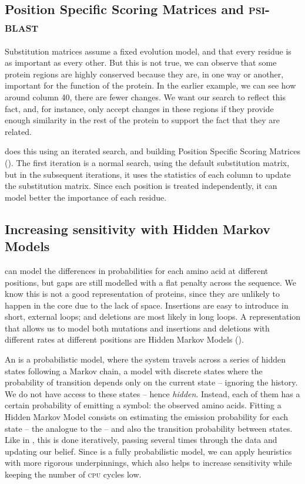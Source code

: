 \subsection[\PSSMs{} and  \PSIBLAST]{Position Specific Scoring Matrices and \textsc{psi-blast}}

Substitution matrices assume a fixed evolution model, and that every residue is as important as every other.
But this is not true, we can observe that some protein regions are highly conserved because they are, in one way or another, important for the function of the protein.
In the earlier example, we can see how around column 40, there are fewer changes.
We want our search to reflect this fact, and, for instance, only accept changes in these regions if they provide enough similarity in the rest of the protein to support the fact that they are related.

\PSIBLAST{} \citep{psiblast} does this using an iterated search, and building Position Specific Scoring Matrices (\PSSM).
The first iteration is a normal \BLAST{} search, using the default substitution matrix, but in the subsequent iterations, it uses the statistics of each column to update the substitution matrix.
Since each position is treated independently, it can model better the importance of each residue.

\subsection[Hidden Markov Models]{Increasing sensitivity with Hidden Markov Models}
\PSSMs{} can model the differences in probabilities for each amino acid at different positions, but gaps are still modelled with a flat penalty across the sequence.
We know this is not a good representation of proteins, since they are unlikely to happen in the core due to the lack of space.
Insertions are easy to introduce in short, external loops; and deletions are most likely in long loops.
A representation that allows us to model both mutations and insertions and deletions with different rates at different positions are Hidden Markov Models (\HMM).

An \HMM{} is a probabilistic model, where the system travels across a series of hidden states following a Markov chain,  
a model with discrete states where the probability of transition depends only on the current state -- ignoring the history.
We do not have access to these states -- hence \emph{hidden}.
Instead, each of them has a certain probability of emitting a symbol: the observed amino acids.
Fitting a Hidden Markov Model consists on estimating the emission probability for each state -- the analogue to the \PSSMs{} -- and also the transition probability between states.
Like in \PSIBLAST, this is done iteratively, passing several times through the data and updating our belief.
Since \HMM{} is a fully probabilistic model, we can apply heuristics with more rigorous underpinnings, which also helps to increase sensitivity while keeping the number of \textsc{cpu} cycles low.

